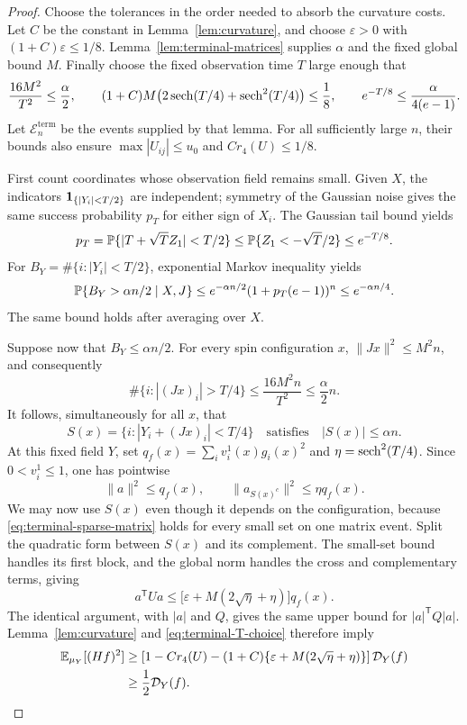 \begin{proof}
Choose the tolerances in the order needed to absorb the curvature costs.
Let $C$ be the constant in Lemma~\ref{lem:curvature}, and choose
$\varepsilon>0$ with $(1+C)\varepsilon\le1/8$.
Lemma~\ref{lem:terminal-matrices} supplies $\alpha$ and the fixed global
bound $M$. Finally choose the fixed observation time $T$ large enough that
\begin{equation}
 \frac{16M^2}{T^2}\le\frac\alpha2,
 \qquad
 (1+C)M\bigl(2\operatorname{sech}(T/4)+\operatorname{sech}^2(T/4)\bigr)\le\frac18,
 \qquad
 e^{-T/8}\le\frac{\alpha}{4(e-1)}.
 \label{eq:terminal-T-choice}
\end{equation}
Let $\mathcal E_n^{\mathrm{term}}$ be the events supplied by that lemma.
For all sufficiently large $n$, their bounds also ensure
$\max|U_{ij}|\le u_0$ and $Cr_4(U)\le1/8$.

First count coordinates whose observation field remains small. Given
$X$, the indicators $\mathbf 1_{\{|Y_i|<T/2\}}$ are independent; symmetry of
the Gaussian noise gives the same success probability $p_T$ for either
sign of $X_i$. The Gaussian tail bound yields
\[
 p_T=\mathbb P\{|T+\sqrt T Z_1|<T/2\}
       \le\mathbb P\{Z_1<-\sqrt T/2\}\le e^{-T/8}.
\]
For $B_Y=\#\{i:|Y_i|<T/2\}$, exponential Markov inequality yields
\[
 \mathbb P\{B_Y>\alpha n/2\mid X,J\}
 \le e^{-\alpha n/2}(1+p_T(e-1))^n
 \le e^{-\alpha n/4}.
\]
The same bound holds after averaging over $X$.

Suppose now that $B_Y\le\alpha n/2$.  For every spin configuration $x$,
$\|Jx\|^2\le M^2n$, and consequently
\[
 \#\{i:|(Jx)_i|>T/4\}\le\frac{16M^2n}{T^2}\le\frac\alpha2 n.
\]
It follows, simultaneously for all $x$, that
\begin{equation}
 S(x)=\{i:|Y_i+(Jx)_i|<T/4\}
 \quad\text{satisfies}\quad |S(x)|\le\alpha n.
 \label{eq:terminal-small-field-set}
\end{equation}
At this fixed field $Y$, set
$q_f(x)=\sum_i v_i^1(x)g_i(x)^2$ and
$\eta=\operatorname{sech}^2(T/4)$.  Since $0<v_i^1\le1$, one has pointwise
\[
 \|a\|^2\le q_f(x),\qquad
 \|a_{S(x)^c}\|^2\le\eta q_f(x).
\]
We may now use $S(x)$ even though it depends on the configuration,
because \eqref{eq:terminal-sparse-matrix} holds for every small set on
one matrix event. Split the quadratic form between $S(x)$ and its
complement. The small-set bound handles its first block, and the global
norm handles the cross and complementary terms, giving
\[
 a^{\mathsf T}Ua
 \le\bigl[\varepsilon+M(2\sqrt\eta+\eta)\bigr]q_f(x).
\]
The identical argument, with $|a|$ and $Q$, gives the same upper bound
for $|a|^{\mathsf T}Q|a|$.  Lemma~\ref{lem:curvature} and
\eqref{eq:terminal-T-choice} therefore imply
\begin{align*}
 \mathbb E_{\mu_Y}[(Hf)^2]
 &\ge\left[1-Cr_4(U)
       -(1+C)\{\varepsilon+M(2\sqrt\eta+\eta)\}\right]\mathcal D_Y(f)\\
 &\ge\frac12\mathcal D_Y(f).
\end{align*}


\end{proof}

